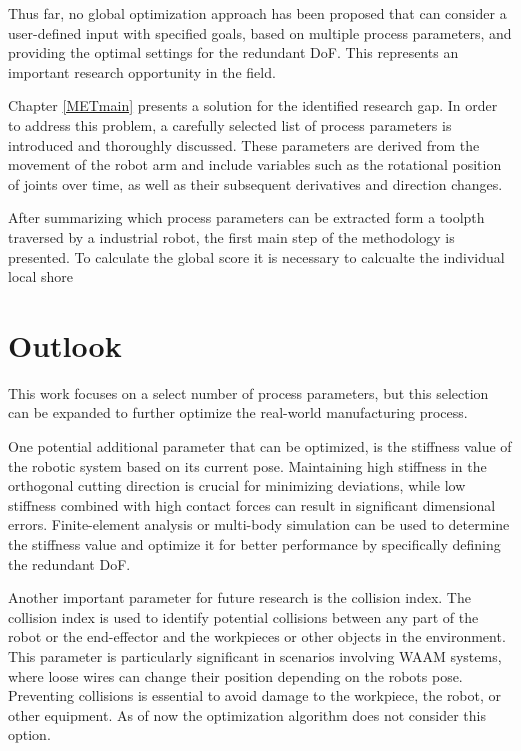 Thus far, no global optimization approach has been proposed that can consider a user-defined input with specified goals, based on multiple process parameters, and providing the optimal settings for the redundant DoF. This represents an important research opportunity in the field.

Chapter \ref{METmain} presents a solution for the identified research gap. In order to address this problem, a carefully selected list of process parameters is introduced and thoroughly discussed. These parameters are derived from the movement of the robot arm and include variables such as the rotational position of joints over time, as well as their subsequent derivatives and direction changes.

After summarizing which process parameters can be extracted form a toolpth traversed by a industrial robot, the first main step of the methodology is presented. To calculate the global score it is necessary to calcualte the individual local shore 

\newpage

\section{Outlook}%

This work focuses on a select number of process parameters, but this selection can be expanded to further optimize the real-world manufacturing process.

One potential additional parameter that can be optimized, is the stiffness value of the robotic system based on its current pose. Maintaining high stiffness in the orthogonal cutting direction is crucial for minimizing deviations, while low stiffness combined with high contact forces can result in significant dimensional errors. Finite-element analysis or multi-body simulation can be used to determine the stiffness value and optimize it for better performance by specifically defining the redundant DoF.

Another important parameter for future research is the collision index. The collision index is used to identify potential collisions between any part of the robot or the end-effector and the workpieces or other objects in the environment. This parameter is particularly significant in scenarios involving WAAM systems, where loose wires can change their position depending on the robots pose. Preventing collisions is essential to avoid damage to the workpiece, the robot, or other equipment. As of now the optimization algorithm does not consider this option.

